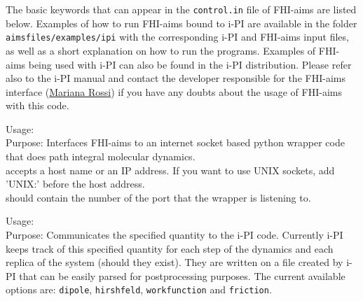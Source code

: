 The basic keywords that can appear in the \texttt{control.in} file of FHI-aims are listed below. Examples of how to run FHI-aims bound to i-PI
are available in the folder \texttt{aimsfiles/examples/ipi} with the corresponding i-PI and FHI-aims input files, as well as a short explanation
on how to run the programs. Examples of FHI-aims being used with i-PI can also be found in the i-PI distribution. Please refer also to the i-PI manual
and contact the developer responsible for the FHI-aims interface (\href{mailto:rossi@fhi-berlin.mpg.de}{Mariana Rossi}) if you have any doubts about
the usage of FHI-aims with this code.

{\noindent
  Usage:    \\[1.0em]
  Purpose: Interfaces FHI-aims to an internet socket based python wrapper code that does path integral molecular dynamics. \\[1.0ex]
   accepts a host name or an IP address. If you want to use UNIX sockets, add 'UNIX:' before the host address. \\[1.0ex]
   should contain the number of the port that the wrapper is listening to.
  \\[1.0em]
}
    
{\noindent
  Usage:   \\[1.0em]
  Purpose: Communicates the specified quantity to the i-PI code. Currently i-PI keeps track of this specified quantity for each step of 
  the dynamics and each replica of the system (should they exist). They are written on a file created by i-PI that can be easily parsed for 
  postprocessing purposes. The current available options are: \texttt{dipole}, \texttt{hirshfeld}, \texttt{workfunction} and \texttt{friction}.
  \\[1.0em]
}

